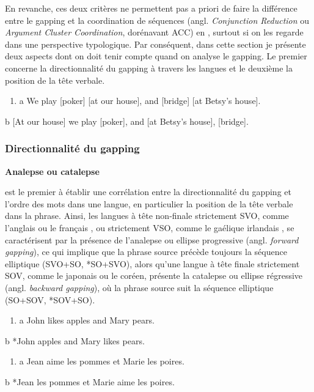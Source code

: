 En revanche, ces deux critères ne permettent pas a priori de faire la différence entre le gapping et la coordination de séquences (angl. \textit{Conjunction Reduction} ou \textit{Argument Cluster Coordination}, dorénavant ACC) en , surtout si on les regarde dans une perspective typologique. Par conséquent, dans cette section je présente deux aspects dont on doit tenir compte quand on analyse le gapping. Le premier concerne la directionnalité du gapping à travers les langues et le deuxième la position de la tête verbale.


\begin{enumerate}
\item \label{bkm:Ref302128626}a   We play [poker] [at our house], and [bridge] [at Betsy's house]. 


\end{enumerate}
  b  [At our house] we play [poker], and [at Betsy's house], [bridge].

\subsubsection{Directionnalité du gapping}
{\bfseries
Analepse ou catalepse}

\citet{Ross1970} est le premier à établir une corrélation entre la directionnalité du gapping et l'ordre des mots dans une langue, en particulier la position de la tête verbale dans la phrase. Ainsi, les langues à tête non-finale strictement SVO, comme l'anglais  ou le français , ou strictement VSO, comme le gaélique irlandais , se caractérisent par la présence de l'analepse ou ellipse progressive (angl. \textit{forward gapping}), ce qui implique que la phrase source précède toujours la séquence elliptique (SVO+SO, *SO+SVO), alors qu'une langue à tête finale strictement SOV, comme le japonais  ou le coréen, présente la catalepse ou ellipse régressive (angl. \textit{backward gapping}), où la phrase source suit la séquence elliptique (SO+SOV, *SOV+SO). 


\begin{enumerate}
\item \label{bkm:Ref287311583}a  John likes apples and Mary pears.


\end{enumerate}
  b  *John apples and Mary likes pears.


\begin{enumerate}
\item \label{bkm:Ref287311587}a  Jean aime les pommes et Marie les poires.


\end{enumerate}
  b  *Jean les pommes et Marie aime les poires.


